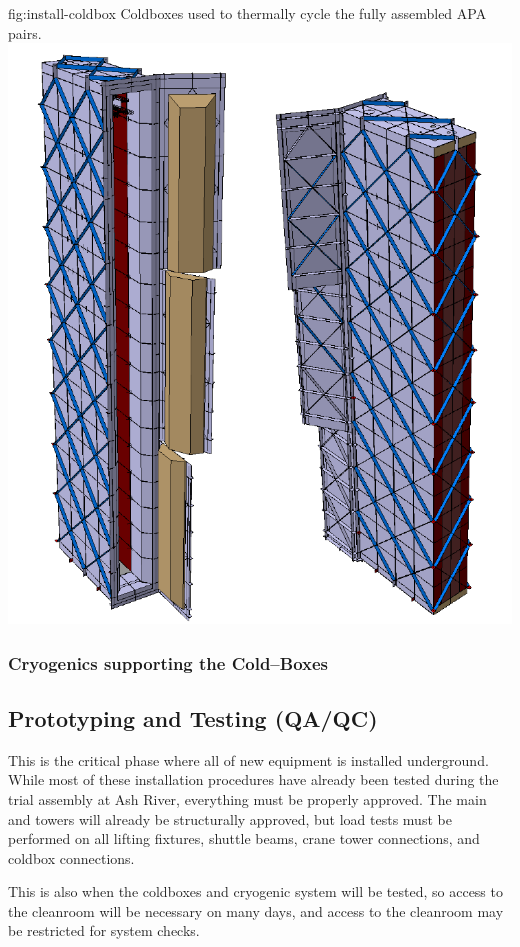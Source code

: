 \begin{dunefigure}{fig:install-coldbox}
  {Coldboxes used to thermally cycle the fully assembled APA pairs. }
\includegraphics[width=.5\textwidth]{graphics/install-coldbox.pdf}
\end{dunefigure}

\subsubsection{Cryogenics supporting the Cold--Boxes}


\clearpage

\subsection{Prototyping and Testing (QA/QC)}
\label{sec:fdsp-tc-infr-qaqc}
This is the critical phase where all of new equipment is installed underground.  While most of these installation procedures have already been tested during the trial assembly at Ash River, everything must be properly approved. The main  and  towers will already be structurally approved, but load tests must be performed on all lifting fixtures, shuttle beams, crane tower connections, and coldbox connections. 

This is also when the coldboxes and cryogenic system will be tested, so access to the cleanroom will be necessary on many days, and access to the cleanroom may be restricted for system checks.


